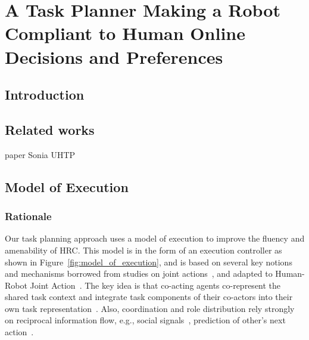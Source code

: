 \ifdefined{}
\else
\setcounter{chapter}{3} %
\dominitoc
\faketableofcontents
\fi

\chapter{A Task Planner Making a Robot Compliant to Human Online Decisions and Preferences}
\label{chap:4}
\minitoc


\section{Introduction}

\section{Related works}
paper Sonia UHTP



\section{Model of Execution}

    \subsection{Rationale}



Our task planning approach uses a model of execution to improve the fluency and amenability of HRC. 
This model is in the form of an execution controller as shown in Figure~\ref{fig:model_of_execution}, and is based on several key notions and mechanisms borrowed from studies on joint actions~\cite{Sebanz-2016,kourtis2014attention}, and adapted to Human-Robot Joint Action~\cite{clodic-2017,curioni-2019}.
The key idea is that co-acting agents co-represent the shared task context and integrate task components of their co-actors into their own task representation~\cite{Schmitz-2017, Yamaguchi-19}. Also, coordination and role distribution rely strongly on reciprocal information flow, e.g., social signals~\cite{curioni-2019}, prediction of other's next action~\cite{luke-2018}.

